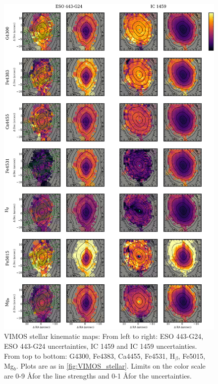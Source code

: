 		\begin{figure}
			\centering
			\includegraphics[height=0.94\textheight]{chapter4/vimos/abs1.png}
			\caption[VIMOS absorption line strength maps]{VIMOS stellar kinematic maps: From left to right: ESO 443-G24, ESO 443-G24 uncertainties, IC 1459 and IC 1459 uncertainties. From top to bottom: G4300, Fe4383, Ca4455, Fe4531, H$_\beta$, Fe5015, Mg$_b$. Plots are as in \ref{fig:VIMOS_stellar}. Limits on the color scale are 0-9 \AA  for the line strengths and 0-1 \AA  for the uncertainties.}
			\label{fig:VIMOS_absorption}
		\end{figure}
